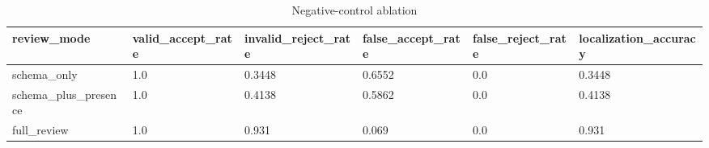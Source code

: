\begin{table}[t]
\centering
\begin{tabular}{l | l | l | l | l | l}
\hline
review_mode & valid_accept_rate & invalid_reject_rate & false_accept_rate & false_reject_rate & localization_accuracy \\
\hline
schema_only & 1.0 & 0.3448 & 0.6552 & 0.0 & 0.3448 \\
schema_plus_presence & 1.0 & 0.4138 & 0.5862 & 0.0 & 0.4138 \\
full_review & 1.0 & 0.931 & 0.069 & 0.0 & 0.931 \\
\hline
\end{tabular}
\caption{Negative-control ablation}
\end{table}

